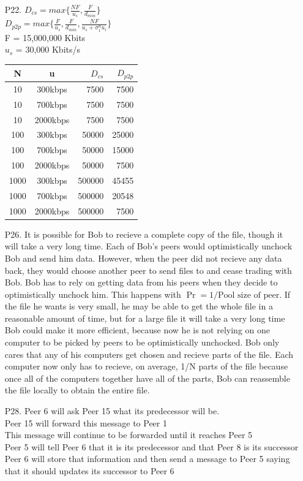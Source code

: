 \documentclass[11pt]{article}
\theoremstyle{definition}
\begin{document}
\begin{enumerate}
\item[P22.]
$D_{cs} = max\{\frac{NF}{u_s}, \frac{F}{d_{min}}\}$\\
$D_{p2p} = max\{\frac{F}{u_s},\frac{F}{d_{min}},\frac{NF}{u_s + \sigma_1^n u_i}\}$\\
F = 15,000,000 Kbits\\
$u_s$ = 30,000 Kbits/s\\
\begin{tabular}{|c|c||r|r|}
\hline
N & u & $D_{cs}$ & $D_{p2p}$\\
\hline
10 & 300kbps & 7500 & 7500\\
10 & 700kbps & 7500 & 7500\\
10 & 2000kbps & 7500 & 7500\\
100 & 300kbps & 50000 & 25000\\
100 & 700kbps & 50000 & 15000\\
100 & 2000kbps & 50000 & 7500\\
1000 & 300kbps & 500000 & 45455\\
1000 & 700kbps & 500000 & 20548\\
1000 & 2000kbps & 500000 & 7500
\end{tabular}

\item[P26.]
It is possible for Bob to recieve a complete copy of the file, though it will take a very long time.  Each of Bob's peers would optimistically unchock Bob and send him data.  However, when the peer did not recieve any data back, they would choose another peer to send files to and cease trading with Bob.  Bob has to rely on getting data from his peers when they decide to optimistically unchock him.  This happens with  $\Pr = 1/\text{Pool size of peer}$.  If the file he wants is very small, he may be able to get the whole file in a reasonable amount of time, but for a large file it will take a very long time\\
\newline
Bob could make it more efficient, because now he is not relying on one computer to be picked by peers to be optimistically unchocked.  Bob only cares that any of his computers get chosen and recieve parts of the file.  Each computer now only has to recieve, on average, 1/N parts of the file because once all of the computers together have all of the parts, Bob can reassemble the file locally to obtain the entire file.

\item[P28.]
Peer 6 will ask Peer 15 what its predecessor will be.\\
Peer 15 will forward this message to Peer 1\\
This message will continue to be forwarded until it reaches Peer 5\\
Peer 5 will tell Peer 6 that it is its predecessor and that Peer 8 is its successor\\
Peer 6 will store that information and then send a message to Peer 5 saying that it should updates its successor to Peer 6\\

\end{enumerate}
\end{document}

